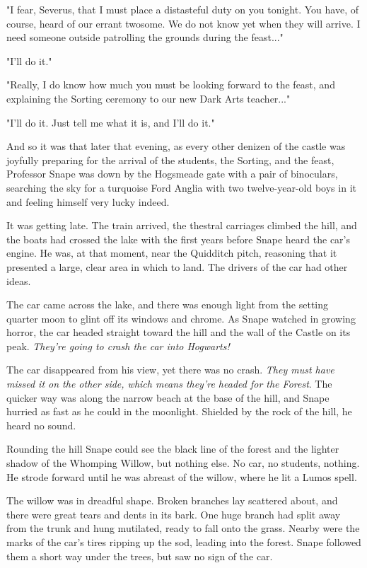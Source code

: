 \documentclass[a4paper,11pt]{article}
\begin{document}
"I fear, Severus, that I must place a distasteful duty on you tonight. You have, of course, heard of our errant twosome. We do not know yet when they will arrive. I need someone outside patrolling the grounds during the feast..."

"I'll do it."

"Really, I do know how much you must be looking forward to the feast, and explaining the Sorting ceremony to our new Dark Arts teacher..."

"I'll do it. Just tell me what it is, and I'll do it."

And so it was that later that evening, as every other denizen of the castle was joyfully preparing for the arrival of the students, the Sorting, and the feast, Professor Snape was down by the Hogsmeade gate with a pair of binoculars, searching the sky for a turquoise Ford Anglia with two twelve-year-old boys in it and feeling himself very lucky indeed.

It was getting late. The train arrived, the thestral carriages climbed the hill, and the boats had crossed the lake with the first years before Snape heard the car's engine. He was, at that moment, near the Quidditch pitch, reasoning that it presented a large, clear area in which to land. The drivers of the car had other ideas.

The car came across the lake, and there was enough light from the setting quarter moon to glint off its windows and chrome. As Snape watched in growing horror, the car headed straight toward the hill and the wall of the Castle on its peak. \emph{They're going to crash the car into Hogwarts!}

The car disappeared from his view, yet there was no crash. \emph{They must have missed it on the other side, which means they're headed for the Forest}. The quicker way was along the narrow beach at the base of the hill, and Snape hurried as fast as he could in the moonlight. Shielded by the rock of the hill, he heard no sound.

Rounding the hill Snape could see the black line of the forest and the lighter shadow of the Whomping Willow, but nothing else. No car, no students, nothing. He strode forward until he was abreast of the willow, where he lit a Lumos spell.

The willow was in dreadful shape. Broken branches lay scattered about, and there were great tears and dents in its bark. One huge branch had split away from the trunk and hung mutilated, ready to fall onto the grass. Nearby were the marks of the car's tires ripping up the sod, leading into the forest. Snape followed them a short way under the trees, but saw no sign of the car.
\end{document}
